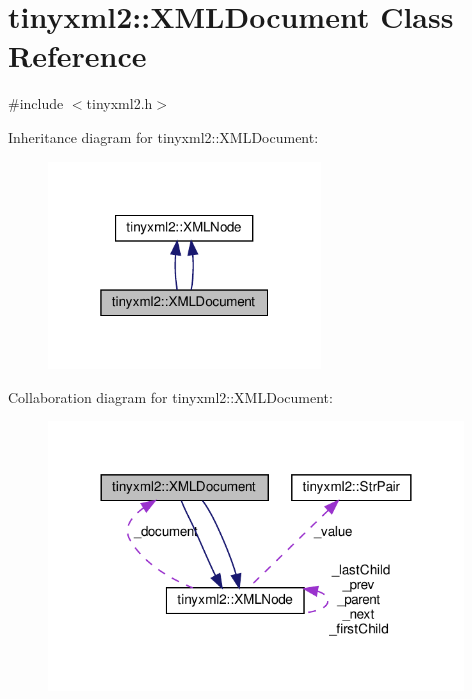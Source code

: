 \hypertarget{classtinyxml2_1_1XMLDocument}{}\section{tinyxml2\+:\+:X\+M\+L\+Document Class Reference}
\label{classtinyxml2_1_1XMLDocument}


{\ttfamily \#include $<$tinyxml2.\+h$>$}



Inheritance diagram for tinyxml2\+:\+:X\+M\+L\+Document\+:
\nopagebreak
\begin{figure}[H]
\begin{center}
\leavevmode
\includegraphics[width=205pt]{classtinyxml2_1_1XMLDocument__inherit__graph}
\end{center}
\end{figure}


Collaboration diagram for tinyxml2\+:\+:X\+M\+L\+Document\+:
\nopagebreak
\begin{figure}[H]
\begin{center}
\leavevmode
\includegraphics[width=312pt]{classtinyxml2_1_1XMLDocument__coll__graph}
\end{center}
\end{figure}
